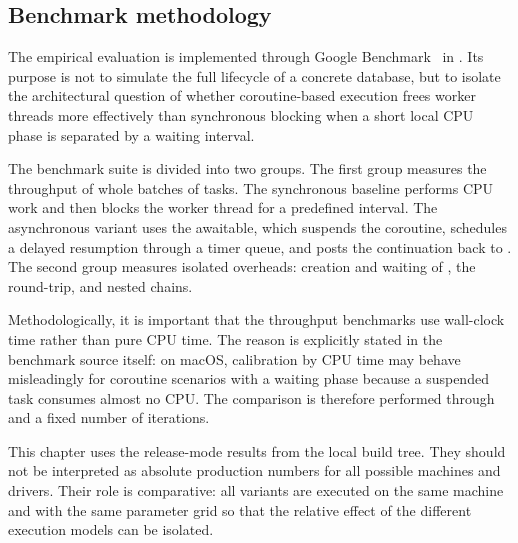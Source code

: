 \subsection{Benchmark methodology}

The empirical evaluation is implemented through Google Benchmark~\cite{google_benchmark_user_guide} in . Its purpose is not to simulate the full lifecycle of a concrete database, but to isolate the architectural question of whether coroutine-based execution frees worker threads more effectively than synchronous blocking when a short local CPU phase is separated by a waiting interval.

The benchmark suite is divided into two groups. The first group measures the throughput of whole batches of tasks. The synchronous baseline performs CPU work and then blocks the worker thread for a predefined interval. The asynchronous variant uses the  awaitable, which suspends the coroutine, schedules a delayed resumption through a timer queue, and posts the continuation back to . The second group measures isolated overheads: creation and waiting of , the  round-trip, and nested  chains.

Methodologically, it is important that the throughput benchmarks use wall-clock time rather than pure CPU time. The reason is explicitly stated in the benchmark source itself: on macOS, calibration by CPU time may behave misleadingly for coroutine scenarios with a waiting phase because a suspended task consumes almost no CPU. The comparison is therefore performed through  and a fixed number of iterations.

This chapter uses the release-mode results from the local  build tree. They should not be interpreted as absolute production numbers for all possible machines and drivers. Their role is comparative: all variants are executed on the same machine and with the same parameter grid so that the relative effect of the different execution models can be isolated.

